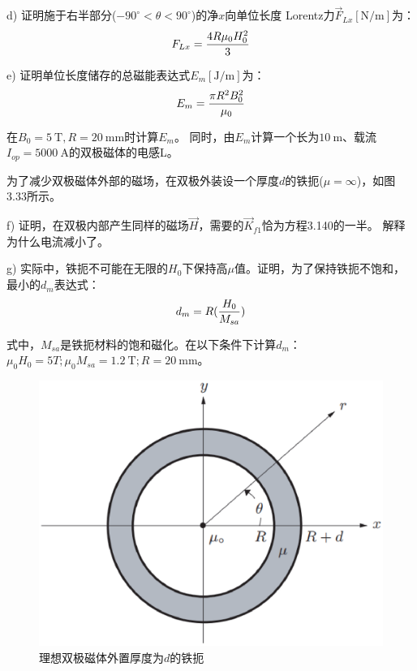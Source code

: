 d) 证明施于右半部分($−90^\circ<\theta<90^\circ$)的净$x$向单位长度
Lorentz力$\vec{F}_{Lx}[\mathrm{N/m}]$为：
\begin{equation}
F_{Lx}=\frac{4R\mu_{0}H_{0}^{2}}{3}\\%
\end{equation}

e) 证明单位长度储存的总磁能表达式$E_m[\mathrm{J/m}]$为：
\begin{equation}
E_{m}=\frac{\pi R^{2}B_{0}^{2}}{\mu_{0}}\\%
\end{equation}

在$B_0=5\ \mathrm{T},R=20\ \mathrm{mm}$时计算$E_m$。
同时，由$E_m$计算一个长为$10\ \mathrm{m}$、载流$I_{op}=5000\ \mathrm{A}$的双极磁体的电感L。

为了减少双极磁体外部的磁场，在双极外装设一个厚度$d$的铁扼($\mu=\infty$)，如图3.33所示。

f) 证明，在双极内部产生同样的磁场$\vec{H}$，需要的$\vec{K}_{f1}$恰为方程3.140的一半。
解释为什么电流减小了。

g) 实际中，铁扼不可能在无限的$H_0$下保持高$\mu$值。证明，为了保持铁扼不饱和，
最小的$d_m$表达式：
\begin{equation}
d_{m}=R(\frac{H_{0}}{M_{sa}})\\%
\end{equation}

式中，$M_{sa}$是铁扼材料的饱和磁化。在以下条件下计算$d_m$：$\mu_0 H_0=5 T;\mu_0 M_{sa}=1.2\ \mathrm{T}; R=20\ \mathrm{mm}$。
\begin{figure}[htbp]
	\centering
	\includegraphics[scale=0.4]{chpt3/figs/fig3.33.eps}
	\caption{理想双极磁体外置厚度为$d$的铁扼}
\end{figure}

